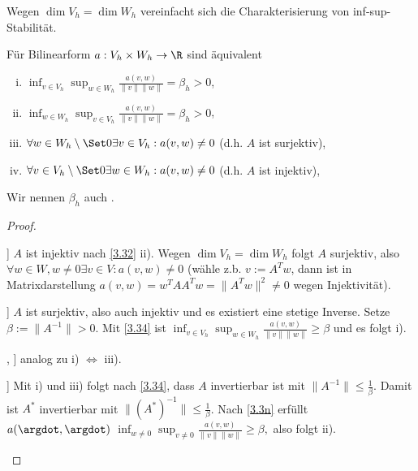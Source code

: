 Wegen $\dim V_h = \dim W_h$ vereinfacht sich die Charakterisierung von inf-sup-Stabilität.

\begin{st} \label{3.46}
	Für Bilinearform $a: V_h \times W_h \to \R$ sind äquivalent
	\begin{enumerate}[i)]
		\item
			$\inf_{v\in V_h} \sup_{w\in W_h} \frac{a(v,w)}{\|v\|\|w\|} = \beta_h > 0$,
		\item
			$\inf_{w\in W_h} \sup_{v\in V_h} \frac{a(v,w)}{\|v\|\|w\|} = \beta_h > 0$,
		\item
			$\forall w \in W_h \setminus \Set 0 \exists v \in V_h : a(v,w) \neq 0$ (d.h. $A$ ist surjektiv),
		\item
			$\forall v \in V_h \setminus \Set 0 \exists w \in W_h : a(v,w) \neq 0$ (d.h. $A$ ist injektiv),
	\end{enumerate}
	\begin{note}
		Wir nennen $\beta_h$ auch .
	\end{note}
	\begin{proof}
		\begin{seg}[\ProofImplication[2,3]]
			$A$ ist injektiv nach \ref{3.32} ii).
			Wegen $\dim V_h = \dim W_h$ folgt $A$ surjektiv, also $\forall w \in W, w \neq 0 \exists v \in V: a(v,w) \neq 0$ (wähle z.b. $v := A^T w$, dann ist in Matrixdarstellung $a(v,w) = w^TA A^T w = \|A^T w\|^2 \neq 0$ wegen Injektivität).
		\end{seg}
		\begin{seg}[\ProofImplication[3,1]]
			$A$ ist surjektiv, also auch injektiv und es existiert eine stetige Inverse.
			Setze $\beta := \|A^{-1}\| > 0$.
			Mit \ref{3.34} ist
			\begin{math}
				\inf_{v\in V_h} \sup_{w\in W_h} \frac{a(v,w)}{\|v\|\|w\|}
				\ge \beta
			\end{math}
			und es folgt i).
		\end{seg}
		\begin{seg}[\ProofImplication[2,4], \Proof\Implication[4,2]]
			analog zu i) $\iff$ iii).
		\end{seg}
		\begin{seg}[\ProofImplication[1, 2]]
			Mit i) und iii) folgt nach \ref{3.34}, dass $A$ invertierbar ist mit $\|A^{-1}\| \le \frac{1}{\beta}$.
			Damit ist $A^*$ invertierbar mit $\|(A^*)^{-1}\| \le \frac{1}{\beta}$.
			Nach \ref{3.3n} erfüllt $a(\argdot, \argdot)$
			\begin{math}
				\inf_{w\neq 0} \sup_{v\neq 0} \frac{a(v,w)}{\|v\|\|w\|}
				\ge \beta,
			\end{math}
			also folgt ii).
		\end{seg}
	\end{proof}
\end{st}

